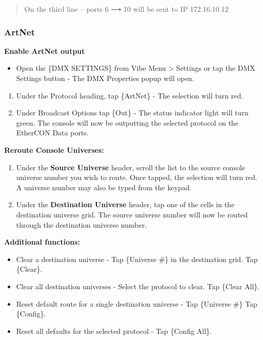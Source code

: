 \documentclass[
]{article}
\providecommand{\tightlist}{%
  \setlength{\itemsep}{0pt}\setlength{\parskip}{0pt}}
\begin{document}
\begin{quote}
On the third line -- ports 6 ⟶ 10 will be sent to IP 172.16.10.12
\end{quote}

\hypertarget{artnet}{%
\subsubsection{ArtNet}\label{artnet}}

\textbf{Enable ArtNet output}

\begin{itemize}
\tightlist
\item
  Open the \{DMX SETTINGS\} from Vibe Menu \textgreater{} Settings or tap the DMX Settings button - The DMX Properties popup will open.
\end{itemize}

\begin{enumerate}
\def\labelenumi{\arabic{enumi}.}
\item
  Under the Protocol heading, tap \{ArtNet\} - The selection will turn red.
\item
  Under Broadcast Options tap \{Out\} - The status indicator light will turn green. The console will now be outputting the selected protocol on the EtherCON Data ports.
\end{enumerate}

\textbf{Reroute Console Universes:}

\begin{enumerate}
\def\labelenumi{\arabic{enumi}.}
\item
  Under the \textbf{Source Universe} header, scroll the list to the source console universe number you wish to route. Once tapped, the selection will turn red. A universe number may also be typed from the keypad.
\item
  Under the \textbf{Destination Universe} header, tap one of the cells in the destination universe grid. The source universe number will now be routed through the destination universe number.
\end{enumerate}

\textbf{Additional functions:}

\begin{itemize}
\item
  Clear a destination universe - Tap \{Universe \#\} in the destination grid. Tap \{Clear\}.
\item
  Clear all destination universes - Select the protocol to clear. Tap \{Clear All\}.
\item
  Reset default route for a single destination universe - Tap \{Universe \#\} Tap \{Config\}.
\item
  Reset all defaults for the selected protocol - Tap \{Config All\}.
\end{itemize}
\end{document}
